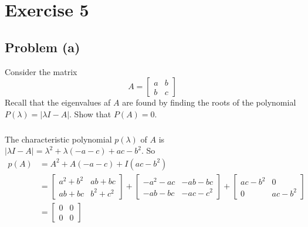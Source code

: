 \documentclass[11pt]{article}
\begin{document}
\section*{Exercise 5}
\subsection*{Problem (a)}
Consider the matrix 
\begin{equation*}
	A=\begin{bmatrix} a & b \\ b & c \end{bmatrix}
\end{equation*}
Recall that the eigenvalues af $A$ are found by finding the roots of the polynomial $P(\lambda)=|\lambda I-A|$. Show that $P(A)=0$.
\subparagraph*{}
The characteristic polynomial $p(\lambda)$ of $A$ is $|\lambda I - A| = \lambda^2 + \lambda(-a-c) + ac - b^2$. So 
\begin{align*}
	p(A) &= A^2 + A(-a-c) + I(ac-b^2) \\
	&= \begin{bmatrix} a^2+b^2 & ab+bc \\ ab+bc & b^2+c^2 \end{bmatrix}+
	\begin{bmatrix} -a^2-ac & -ab-bc \\ -ab-bc & -ac-c^2 \end{bmatrix}+
	\begin{bmatrix} ac-b^2 & 0 \\ 0 & ac-b^2 \end{bmatrix} \\
	&= \begin{bmatrix} 0 & 0 \\ 0 & 0 \end{bmatrix}
\end{align*}
\end{document}
